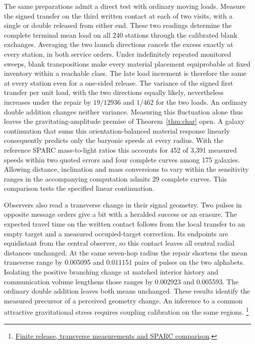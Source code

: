 \documentclass[11pt]{article}
\begin{document}
The same preparations admit a direct test with ordinary moving loads.
Measure the signed transfer on the third written contact at each of
two visits, with a single or double released from either end. These
two readings determine the complete terminal mean load on all 240
stations through the calibrated blank exchanges. Averaging the
two launch directions cancels the excess exactly at every station,
in both service orders. Under indefinitely repeated monitored sweeps,
blank transpositions make every material placement equiprobable at
fixed inventory within a reachable class. The late load increment is
therefore the same at every station even for a one-sided release. The variance of
the signed first transfer per unit load, with the two directions
equally likely, nevertheless increases under the repair by \(19/12936\)
and \(1/462\) for the two loads. An ordinary double addition changes
neither variance. Measuring this fluctuation alone thus leaves the
gravitating-amplitude premise of Theorem~\ref{thm:char} open.
A galaxy continuation that sums this
orientation-balanced material response linearly consequently predicts
only the baryonic speeds at every radius. With the reference SPARC
mass-to-light ratios this accounts for 452 of 3,391 measured speeds
within two quoted errors and four complete curves among 175 galaxies.
Allowing distance, inclination and mass conversions to vary within
the sensitivity ranges in the accompanying computation admits 29
complete curves. This comparison tests the specified linear continuation.

Observers also read a transverse change in their signal geometry.
Two pulses in opposite message orders give a bit with a heralded
success or an erasure. The expected travel time on the written contact
follows from the local transfer to an empty target and a measured
occupied-target correction. Its endpoints are equidistant from the
central observer, so this contact leaves all central radial distances
unchanged. At the same seven-hop radius the repair shortens the mean
transverse range by 0.005095 and 0.011151 pairs of pulses on the two
alphabets. Isolating the positive branching change at matched interior
history and communication volume lengthens those ranges by 0.002923
and 0.005593. The ordinary double addition leaves both means unchanged.
These results identify the measured precursor of a perceived geometry
change. An inference to a common attractive gravitational stress
requires coupling calibration on the same regions.%
\footnote{\href{https://github.com/FloatingPragma/observer-patch-holography/blob/main/model/experiments/interval_echo_shell_flux/product_address/green_response/material_recoil/overlap_source/native_boundary/stock/aperture/MOVING_RESULTS.md}{Finite release, transverse measurements and SPARC comparison}.}
\end{document}
